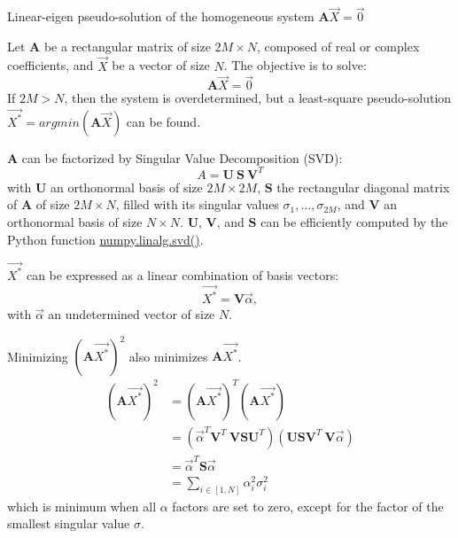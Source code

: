 \newpage
\begin{algorithm}[!ht]
  \caption{Linear-eigen pseudo-solution of the homogeneous system \(\textbf{A} \overrightarrow{X} = \overrightarrow{0}\)}\label{alg:svd}
  \begin{algorithmic}[1]
      \STATEx Let $\textbf{A}$ be a rectangular matrix of size $2M \times N$, composed of real or complex coefficients, and $\overrightarrow{X}$ be a vector of size $N$. The objective is to solve: 
      \begin{equation}
        \textbf{A} \overrightarrow{X} = \overrightarrow{0}
      \end{equation}
      \STATEx If $2M>N$, then the system is overdetermined, but a least-square pseudo-solution $\overrightarrow{X^*} = argmin(\textbf{A} \overrightarrow{X})$ can be found.
      
      \STATE \textbf{A} can be factorized by Singular Value Decomposition (SVD):
      \begin{equation}
        A = \textbf{U} \ \textbf{S} \ \textbf{V}^T
      \end{equation}
      with $\textbf{U}$ an orthonormal basis of size $2M \times 2M$, \(\textbf{S}\) the rectangular diagonal matrix of \textbf{A} of size $2M \times N$, filled with its singular values \(\sigma_1, \dots, \sigma_{2M}\), and $\textbf{V}$ an orthonormal basis of size $N \times N$. $\textbf{U}$, $\textbf{V}$, and $\textbf{S}$ can be efficiently computed by the Python function \href{https://numpy.org/doc/stable/reference/generated/numpy.linalg.svd.html}{numpy.linalg.svd()}.
      
      \STATE \(\overrightarrow{X^*}\) can be expressed as a linear combination of basis vectors: 
      \begin{equation}\label{eq:xva}
        \overrightarrow{X^*} = \textbf{V} \overrightarrow{\alpha},
      \end{equation}
      with \(\overrightarrow{\alpha}\) an undetermined vector of size $N$.  
      
      \STATE Minimizing \((\textbf{A}\overrightarrow{X^*})^2\) also minimizes \(\textbf{A}\overrightarrow{X^*}\).
      \begin{equation}
          \begin{aligned}
          (\textbf{A}\overrightarrow{X^*})^2 & = (\textbf{A} \overrightarrow{X^*})^T (\textbf{A} \overrightarrow{X^*})\\
          & = (\overrightarrow{\alpha}^T \textbf{V}^T \ \textbf{V} \textbf{S} \textbf{U}^T)(\textbf{U} \textbf{S} \textbf{V}^T \ \textbf{V}\overrightarrow{\alpha})\\
          & = \overrightarrow{\alpha}^T \textbf{S} \overrightarrow{\alpha}\\
          & = \sum_{i \in [1,N]} \alpha_i^2 \sigma_i^2
          \end{aligned}
      \end{equation}
      which is minimum when all \(\alpha\) factors are set to zero, except for the factor of the smallest singular value \(\sigma\). 


\end{algorithmic}
\end{algorithm}

